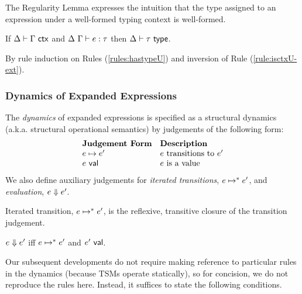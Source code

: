 The Regularity Lemma expresses the intuition that the type assigned to an expression under a well-formed typing context is well-formed. 
\begin{lemma}[Regularity]\label{lemma:regularity-U} If $\Delta \vdash \Gamma~\mathsf{ctx}$ and $\Delta~\Gamma \vdash e : \tau$ then $\Delta \vdash \tau~\mathsf{type}$.\end{lemma}
\begin{proof-sketch}
By rule induction on Rules (\ref{rules:hastypeU}) and inversion of Rule (\ref{rule:isctxU-ext}). 
\end{proof-sketch}
\subsubsection{Dynamics of Expanded Expressions}
The \emph{dynamics} of expanded expressions is specified as a structural dynamics (a.k.a. structural operational semantics) by judgements of the following form:
\[\begin{array}{ll}
\textbf{Judgement Form} & \textbf{Description}\\
e \mapsto e' & \text{$e$ transitions to $e'$}\\
e~\mathsf{val} & \text{$e$ is a value}
\end{array}\]
We also define auxiliary judgements for \emph{iterated transitions}, $e \mapsto^{*} e'$, and \emph{evaluation}, $e \Downarrow e'$.

\begin{definition}\label{defn:iterated-transition-U} Iterated transition, $e \mapsto^{*} e'$, is the reflexive, transitive closure of the transition judgement.\end{definition}

\begin{definition}[Evaluation]\label{defn:evaluation-U}  $e \Downarrow e'$ iff $e \mapsto^{*} e'$ and $e'~\mathsf{val}$. \end{definition}

Our subsequent developments do not require making reference to particular rules in the dynamics (because TSMs operate statically), so for concision, we do not reproduce the rules here. Instead, it suffices to state the following conditions.

